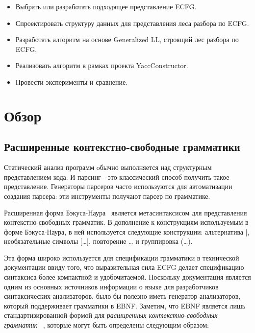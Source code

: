 \documentclass[12pt]{matmex-diploma-custom}
\begin{document}
	\begin{itemize}  
		\item Выбрать или разработать подходящее представление ECFG.
		\item Спроектировать структуру данных для представления леса разбора по ECFG.
		\item Разработать алгоритм на основе Generalized LL, строящий лес разбора по ECFG.
		\item Реализовать алгоритм в рамках проекта YaccConstructor.
		\item Провести эксперименты и сравнение.
	\end{itemize}
	
	\section{Обзор}
	
	\subsection{Расширенные контекстно-свободные грамматики}
	Статический анализ программ oбычно выполняется над структурным представлением кода. 
	И парсинг - это классический способ получить такое представление. Генераторы парсеров
	часто используются для автоматизации создания парсера: эти инструменты получают 
	парсер по грамматике.
	
	Расширенная форма Бэкуса-Наура~\cite{EBNFISO} является метасинтаксисом для представления 
	контекстно-свободных грамматик. В дополнение к конструкциям используемым в форме
	Бэкуса-Наура, в ней используется следующие конструкции: альтернатива |,
	необязательные символы [\dots], повторение {\dots} и группировка (\dots).
	
	Эта форма широко используется для спецификации грамматики в технической документации
	ввиду того, что выразительная сила ECFG делает спецификацию синтаксиса более компактной
	и удобочитаемой. Поскольку документация является одним из основных источников информации
	о языке для разработчиков синтаксических анализаторов, было бы полезно иметь генератор
	анализаторов, который поддерживает грамматики в EBNF. Заметим, что EBNF является 
	лишь стандартизированной формой для \textit{расширенных контекстно-свободных грамматик}
	~\cite{ECFG}, которые могут быть определены следующим образом:
	
\end{document}

